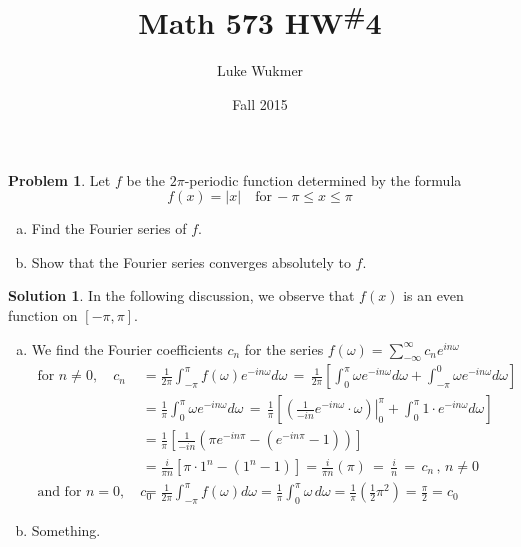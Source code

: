 \documentclass[10pt]{article}
\theoremstyle{plain}
\theoremstyle{definition}
\newtheorem{prob}{Problem}
\newtheorem*{soln*}{Solution}
\numberwithin{equation}{section}
\begin{document}
\title{Math 573 HW\textsuperscript{\#}4}
\author{Luke Wukmer}
\date{Fall 2015}
\maketitle \thispagestyle{empty} %
\lstset{language=Python}

\begin{prob}
    Let $f$ be the $2\pi$-periodic function determined by the formula
    \[
            f(x) = \left|{x}\right| \quad \text{for} \,   -\pi \leq x \leq \pi
    \]

\begin{enumerate}[(a)]
    \item Find the Fourier series of $f$.
    \item Show that the Fourier series converges absolutely to $f$.
\end{enumerate}
\end{prob}

\begin{soln*} In the following discussion, we observe that $f(x)$ is an even function on ${[-\pi,\pi]}$.
    \begin{enumerate}[(a)]
        \item 
            We find the Fourier coefficients $c_n$ for the series
            $f(\omega) = \sum_{-\infty}^\infty c_n e^{in\omega} $
            \begin{align*}
                \text{for } n \neq 0, \quad
                c_n &= \frac{1}{2\pi} \int_{-\pi}^{\pi} f(\omega) e^{- i n\omega} d\omega 
                    \,=\, \frac{1}{2\pi}
                        \left[ \int_{0}^{\pi} \omega e^{-in\omega} d\omega
                        + \int_{-\pi}^{0} \omega e^{-in\omega} d\omega \right] \\
                    &= \frac{1}{\pi} \int_{0}^{\pi} \omega e^{-in\omega} d\omega 
                    \,=\, \frac{1}{\pi} \left[
                        \left.\left( \frac{1}{-in} e^{-in\omega} \cdot \omega \right)\right|_0^\pi
                + \int_0^\pi 1\cdot e^{-in\omega} d\omega \right] \\
                &= \frac{1}{\pi}\left[ \frac{1}{-in}
                    \left(\pi e^{-in\pi} - (e^{-in\pi} - 1)\right)\right] \\
                    &= \frac{i}{\pi n} \left[ \pi \cdot 1^n - ( 1^n - 1) \right] = \frac{i}{\pi n} (\pi)
                    \,=\, \boxed{\frac{i}{n} \,=\, c_n \,,\, n\neq 0}\\
                \text{and for } n = 0, \quad
                c_0 &= \frac{1}{2\pi} \int_{-\pi}^{\pi} f(\omega) d\omega
                     = \frac{1}{\pi} \int_{0}^\pi \omega\, d\omega = \frac{1}{\pi}\left( \frac{1}{2} \pi^2\right)
                     = \boxed{\frac{\pi}{2} = c_0}
            \end{align*}
        \item Something. 
    \end{enumerate}
\end{soln*}
\end{document}
